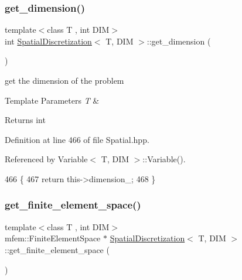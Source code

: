 \subsubsection{\texorpdfstring{get\+\_\+dimension()}{get\_dimension()}}
{\footnotesize\ttfamily template$<$class T , int D\+IM$>$ \\
int \hyperlink{classSpatialDiscretization}{Spatial\+Discretization}$<$ T, D\+IM $>$\+::get\+\_\+dimension (\begin{DoxyParamCaption}{ }\end{DoxyParamCaption})}



get the dimension of the problem 


\begin{DoxyTemplParams}{Template Parameters}
{\em T} & \\
\hline
\end{DoxyTemplParams}
\begin{DoxyReturn}{Returns}
int 
\end{DoxyReturn}


Definition at line 466 of file Spatial.\+hpp.



Referenced by Variable$<$ T, D\+I\+M $>$\+::\+Variable().


\begin{DoxyCode}
466                                                  \{
467   \textcolor{keywordflow}{return} this->dimension\_;
468 \}
\end{DoxyCode}
\mbox{\label{classSpatialDiscretization_ac001fc2ff356fe8c0c2b49618e594a03}} 
\subsubsection{\texorpdfstring{get\+\_\+finite\+\_\+element\+\_\+space()}{get\_finite\_element\_space()}}
{\footnotesize\ttfamily template$<$class T , int D\+IM$>$ \\
mfem\+::\+Finite\+Element\+Space $\ast$ \hyperlink{classSpatialDiscretization}{Spatial\+Discretization}$<$ T, D\+IM $>$\+::get\+\_\+finite\+\_\+element\+\_\+space (\begin{DoxyParamCaption}{ }\end{DoxyParamCaption})}



